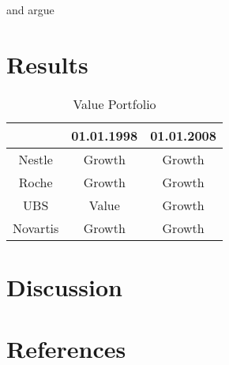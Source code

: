 \documentclass{article}
\begin{document}
\cite{Milgrom1982} and \cite{Gormsen2020} argue \blindtext
\newpage

\section{Results}

\begin{table} [!h] \centering 
  \begin{threeparttable}
    \caption{Value Portfolio}
     \begin{tabular}{ccc}
        \toprule
			    	& 01.01.1998 & 01.01.2008\\ 
		\midrule
		Nestle  	& Growth 	& Growth     \\
		Roche 		& Growth 	& Growth        \\ 
		UBS 		& Value 	& Growth \\
		Novartis 	& Growth 	& Growth
		\\ 
		\bottomrule

\end{tabular}
\end{threeparttable}
\end{table}

\blindtext
\newpage

\section{Discussion}
\blindtext
\newpage







\section{References}
\begingroup
\renewcommand{\section}[2]{}
\nocite{*}
\printbibliography
\endgroup

\newpage
\end{document}
